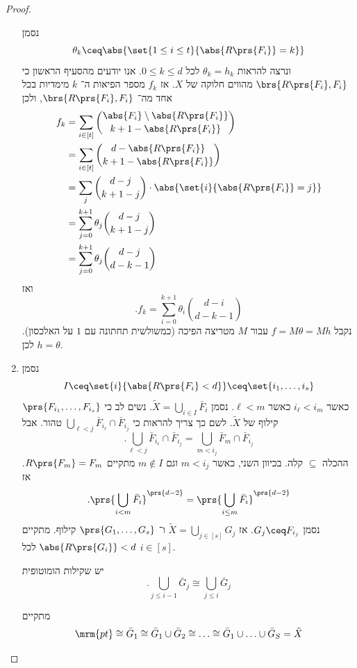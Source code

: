\documentclass[a4paper,10pt,twoside,openany]{book}
\begin{document}
\begin{proof}
\begin{enumerate}
נסמן
\[\theta_k \ceq \abs{\set{1 \leq i \leq t}{\abs{R\prs{F_i}} = k}}\]
ונרצה להראות
$\theta_k = h_k$
לכל
$0 \leq k \leq d$.
אנו יודעים מהסעיף הראשון כי
$\brs{R\prs{F_i}, F_i}$
מהווים חלוקה של
$X$.
אז
$f_k$
מספר הפיאות ה־%
$k$
מימדיות בכל אחד מה־%
$\brs{R\prs{F_i}, F_i}$,
ולכן
\begin{align*}
f_k &= \sum_{i \in [t]} \binom{\abs{F_i} \setminus \abs{R\prs{F_i}}}{k+1 - \abs{R\prs{F_i}}}
\\&=
\sum_{i \in [t]} \binom{d-\abs{R\prs{F_i}}}{k+1 - \abs{R\prs{F_i}}}
\\&=
\sum_{j} \binom{d-j}{k+1-j} \cdot \abs{\set{i}{\abs{R\prs{F_i}} = j}}
\\&=
\sum_{j=0}^{k+1} \theta_j \binom{d-j}{k+1-j}
\\&= \sum_{j=0}^{k+1} \theta_j \binom{d-j}{d-k-1}
\end{align*}
ואז
\[\text{.} f_k = \sum_{i=0}^{k+1} \theta_i \binom{d-i}{d-k-1}\]
נקבל
$f = M\theta = Mh$
עבור
$M$
מטריצה הפיכה (כמשולשית תחתונה עם
$1$
על האלכסון).
לכן
$h = \theta$.

\item נסמן
\[I \ceq \set{i}{\abs{R\prs{F_i} < d}} \ceq \set{i_1, \ldots, i_s}\]
כאשר
$i_\ell < i_m$
כאשר
$\ell < m$.
נסמן
$\tilde{X} = \bigcup_{i \in I} \bar{F}_i$.
נשים לב כי
$\prs{F_{i_1}, \ldots, F_{i_s}}$
קילוף של
$\tilde{X}$.
לשם כך צריך להראות כי
$\bigcup_{\ell < j} \bar{F}_{i_\ell} \cap \bar{F}_{i_j}$
טהור.
אבל
\[\text{.} \bigcup_{\ell < j} \bar{F}_{i_\ell} \cap \bar{F}_{i_j} = \bigcup_{m < i_j} \bar{F}_m \cap \bar{F}_{i_j}\]
ההכלה
$\subseteq$
קלה. בכיוון השני, כאשר
$m < i_j$
וגם
$m \notin I$
מתקיים
$R\prs{F_m} = F_m$.
אז
\[\text{.} \prs{\bigcup_{i < m} \bar{F}_i}^{\prs{d-2}} = \prs{\bigcup_{i \leq m} \bar{F}_i}^{\prs{d-2}}\]
נסמן
$G_j \ceq F_{i_j}$.
אז
$\tilde{X} = \bigcup_{j \in [s]} G_j$
ו־%
$\prs{G_1, \ldots, G_s}$
קילוף.
מתקיים
$\abs{R\prs{G_i}} < d$
לכל
$i \in [s]$.

\begin{claim}
יש שקילות הומוטופית
\[\text{.} \bigcup_{j \leq i-1} \bar{G}_j \cong \bigcup_{j \leq i} \bar{G}_j\]
\end{claim}

\begin{corollary}
מתקיים
\[\mrm{pt} \cong \bar{G}_1 \cong \bar{G}_1 \cup \bar{G}_2 \cong \ldots \cong \bar{G}_1 \cup \ldots \cup \bar{G}_S = \tilde{X}\]
\end{corollary}
\end{enumerate}
\end{proof}
\end{document}
